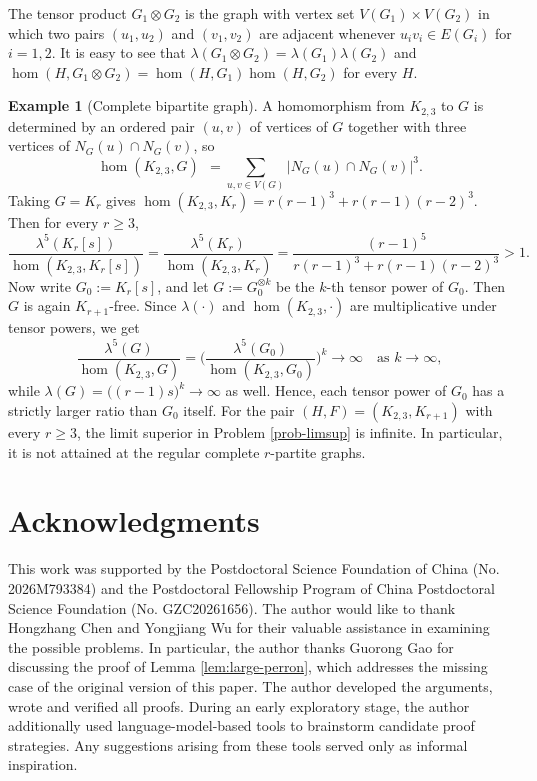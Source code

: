 \documentclass[11pt, a4paper]{article}
\theoremstyle{definition}
\newtheorem{example}[theorem]{Example}
\theoremstyle{plain}
\renewcommand{\ge}{\geqslant}
\begin{document}
The tensor product
$G_1\otimes G_2$ is the graph with vertex set  $V(G_1)\times V(G_2)$ in which two pairs $(u_1,u_2)$ and
$(v_1,v_2)$ are adjacent whenever $u_iv_i\in E(G_i)$
for $i=1,2$. It is easy to see that 
$\lambda (G_1\otimes G_2)
 =\lambda (G_1)\lambda (G_2)$ and 
$\hom (H,G_1\otimes G_2)
 =\hom (H,G_1)\hom (H,G_2)$ for every $H$. 
 


\begin{example}[Complete bipartite graph]
\label{ex:K23-not-turan}
 A homomorphism from
$K_{2,3}$ to $G$ is determined by an ordered pair $(u,v)$ of
vertices of $G$ together with three vertices of
$N_G(u)\cap N_G(v)$, so
\[
  \hom (K_{2,3},G) \ \  =\sum_{u,v\in V(G)}
  \bigl|N_G(u)\cap N_G(v)\bigr|^{3}.
\]
Taking $G=K_r$ gives
$\hom (K_{2,3},K_r)=r(r-1)^{3}+r(r-1)(r-2)^{3}$. 
Then for every $r\ge 3$, 
\[   \frac{\lambda^{5}(K_r[s])}{\hom (K_{2,3},K_r[s])} =  
\frac{\lambda^{5}(K_r )}{\hom (K_{2,3},K_r)} = 
 \frac{(r-1)^5}{r(r-1)^{3}+r(r-1)(r-2)^{3}} >1. \]
 Now write $G_0:=K_r[s]$, and let $G:=G_0^{\otimes k}$ be the $k$-th tensor power of $G_0$. 
 Then $G$ is again $K_{r+1}$-free. Since $\lambda (\cdot )$ and $\hom (K_{2,3},\cdot )$ are
multiplicative under tensor powers,  
we get 
\[   \frac{\lambda^{5}(G)}{\hom (K_{2,3},G)} = 
 \bigg(\frac{\lambda^{5}(G_0)}{\hom (K_{2,3},G_0)}\bigg)^{\! k}  \to \infty \quad \text{as $k\to \infty$}, \]
 while $\lambda (G)=\bigl((r-1)s\bigr)^{k}\to \infty$ as well. Hence, each tensor power of $G_0$ has a strictly larger ratio than $G_0$ itself. For the pair 
 $(H,F)=(K_{2,3},K_{r+1})$ with every $r\ge 3$, the limit superior in Problem
\ref{prob-limsup} is infinite. 
In particular, it is not attained at the regular complete $r$-partite graphs. 
\end{example}


 



\section*{Acknowledgments}
This work was supported by the Postdoctoral 
Science Foundation of China (No. 2026M793384) and 
the Postdoctoral Fellowship Program of China Postdoctoral Science Foundation (No. GZC20261656). 
The author would like to thank Hongzhang Chen and Yongjiang Wu for their valuable assistance in examining the possible problems. In particular, the author thanks Guorong Gao for discussing the proof of Lemma \ref{lem:large-perron}, which addresses the missing case of the original version of this paper.  The author developed the arguments, wrote and verified all proofs. During an early exploratory stage, the author additionally used language-model-based tools to brainstorm candidate proof strategies. Any suggestions arising from these tools served only as informal inspiration. 
\end{document}
